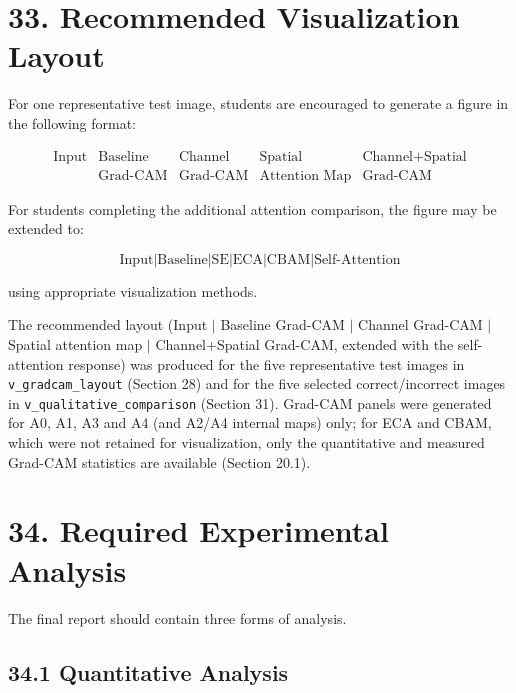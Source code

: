 \documentclass[10pt]{article}
\begin{document}
\section*{33. Recommended Visualization Layout}

For one representative test image, students are encouraged to generate a
figure in the following format:

\[
\boxed{
\begin{array}{ccccc}
\text{Input}
&
\text{Baseline}
&
\text{Channel}
&
\text{Spatial}
&
\text{Channel+Spatial}
\\
&
\text{Grad-CAM}
&
\text{Grad-CAM}
&
\text{Attention Map}
&
\text{Grad-CAM}
\end{array}
}
\]

For students completing the additional attention comparison, the figure may
be extended to:

\[
\boxed{
\text{Input}
|
\text{Baseline}
|
\text{SE}
|
\text{ECA}
|
\text{CBAM}
|
\text{Self-Attention}
}
\]

using appropriate visualization methods.


The recommended layout (Input $|$ Baseline Grad-CAM $|$ Channel Grad-CAM $|$ Spatial attention map $|$ Channel+Spatial Grad-CAM, extended with the self-attention response) was produced for the five representative test images in
\texttt{v\_gradcam\_layout} (Section 28) and for the five selected correct/incorrect images in \texttt{v\_qualitative\_comparison} (Section 31). Grad-CAM panels were generated for A0, A1, A3 and A4 (and A2/A4 internal maps) only; for ECA and CBAM, which were not retained for visualization, only the quantitative
and measured Grad-CAM statistics are available (Section 20.1).

\section*{34. Required Experimental Analysis}

The final report should contain three forms of analysis.

\subsection*{34.1 Quantitative Analysis}
\end{document}
